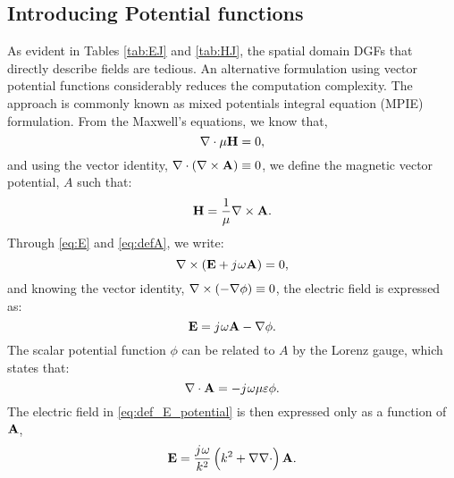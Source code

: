 \subsection{Introducing Potential functions}
%
As evident in Tables \ref{tab:EJ} and \ref{tab:HJ}, the spatial domain DGFs that directly describe fields are tedious. An alternative formulation using vector potential functions considerably reduces the computation complexity. The approach is commonly known as mixed potentials integral equation (MPIE) formulation. From the Maxwell's equations, we know that,
%
\begin{equation}
  \nabla \cdot  \mu \mathbf{H} = 0,
  \label{eq:divergencless}
\end{equation}
%
and using the vector identity, $\nabla \cdot (\nabla \times \mathbf{A}) \equiv 0$, we define the magnetic vector potential, $A$ such that:
%
\begin{equation}
 \mathbf{H} = \frac{1}{\mu} \nabla \times \mathbf{A}.
 \label{eq:defA}
\end{equation}
%
Through \eqref{eq:E} and \eqref{eq:defA}, we write:
%
\begin{equation}
  \nabla \times (\mathbf{E} + {j}\mkern1mu \omega \mathbf{A}) = 0,
  \label{eq:EandA}
\end{equation}
%
and knowing the vector identity, $\nabla \times (-\nabla \phi) \equiv 0$, the electric field is expressed as:
%
\begin{equation}
  \mathbf{E} = {j}\mkern1mu \omega \mathbf{A} - \nabla \phi.
  \label{eq:def_E_potential}
\end{equation}
%
The scalar potential function $\phi$ can be related to $A$ by the Lorenz gauge, which states that:
%
\begin{equation}
  \nabla \cdot \mathbf{A} = -{j}\mkern1mu \omega \mu \varepsilon \phi.
  \label{eq:Lorenz_gauge}
\end{equation}
%
The electric field in \eqref{eq:def_E_potential} is then expressed
only as a function of $\mathbf{A}$,
%
\begin{equation}
  \mathbf{E} = \frac{{j}\mkern1mu \omega}{k^2}\left( k^2 + \nabla \nabla \cdot \right) \mathbf{A}.
  \label{eq:EinA}
\end{equation}
%

